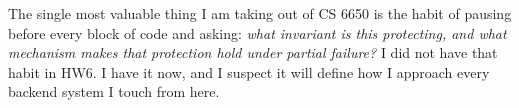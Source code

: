 \documentclass[11pt,a4paper]{article}
\begin{document}
\begin{openingbox}
The single most valuable thing I am taking out of CS 6650 is the habit of pausing before every block of code and asking: \textit{what invariant is this protecting, and what mechanism makes that protection hold under partial failure?} I did not have that habit in HW6. I have it now, and I suspect it will define how I approach every backend system I touch from here.
\end{openingbox}
\end{document}
